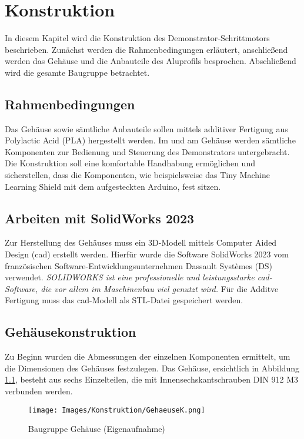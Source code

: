 %
%
%

\chapter{Konstruktion}

In diesem Kapitel wird die Konstruktion des Demonstrator-Schrittmotors beschrieben. Zunächst werden die Rahmenbedingungen erläutert, anschließend werden das Gehäuse und die Anbauteile des Aluprofils besprochen. Abschließend wird die gesamte Baugruppe betrachtet.

\section{Rahmenbedingungen}

Das Gehäuse sowie sämtliche Anbauteile sollen mittels additiver Fertigung aus Polylactic Acid (PLA) hergestellt werden. Im und am Gehäuse werden sämtliche Komponenten zur Bedienung und Steuerung des Demonstrators untergebracht. Die Konstruktion soll eine komfortable Handhabung ermöglichen und sicherstellen, dass die Komponenten, wie beispielsweise das Tiny Machine Learning Shield mit dem aufgesteckten Arduino, fest sitzen.

\section{Arbeiten mit SolidWorks 2023}

Zur Herstellung des Gehäuses muss ein 3D-Modell mittels Computer Aided Design (\ac{cad}) erstellt werden. Hierfür wurde die Software SolidWorks 2023 vom französischen Software-Entwicklungsunternehmen Dassault Systèmes (DS) verwendet. \glqq \textit{SOLIDWORKS ist eine professionelle und leistungsstarke \ac{cad}-Software, die vor allem im Maschinenbau viel genutzt wird.}\grqq \cite[S.225]{Weber.2024} Für die Additve Fertigung muss das \ac{cad}-Modell als STL-Datei gespeichert werden. 

\section{Gehäusekonstruktion}

Zu Beginn wurden die Abmessungen der einzelnen Komponenten ermittelt, um die Dimensionen des Gehäuses festzulegen. Das Gehäuse, ersichtlich in Abbildung \ref{GehK}, besteht aus sechs Einzelteilen, die mit Innensechskantschrauben DIN 912 M3 verbunden werden.
	\begin{figure}[H]	
	 	\begin{center}
			\texttt{[image: Images/Konstruktion/GehaeuseK.png]}
			\caption{Baugruppe Gehäuse (Eigenaufnahme)} \label{GehK}
		\end{center}
	\end{figure}

